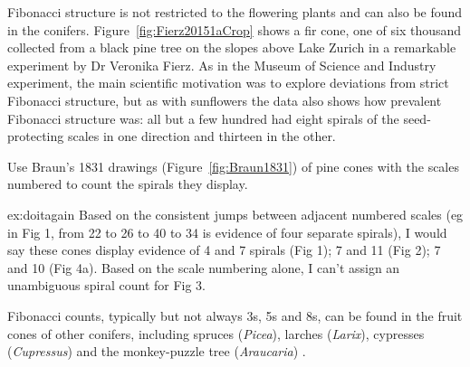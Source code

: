 Fibonacci structure is not restricted to the flowering plants and can also be found in the conifers. 
Figure~\ref{fig:Fierz20151aCrop} shows a fir cone, one of six thousand collected from a black pine tree on the slopes above Lake Zurich in a remarkable experiment by Dr Veronika Fierz. As in the Museum of Science and Industry experiment, the main scientific motivation was to explore deviations from strict Fibonacci structure, but as with sunflowers the data also shows how prevalent Fibonacci structure was: all but a few hundred had eight spirals of the seed-protecting scales in one direction and thirteen in the other. 
%

\begin{jExercise}
	\label{ex:doitagain}
	Use Braun's 1831 drawings (Figure~\ref{fig:Braun1831}) of pine cones with the scales numbered to count the spirals they display.
\end{jExercise}
\begin{jAnswer}{ex:doitagain}
Based on the consistent jumps between adjacent numbered scales (eg in Fig 1, from 22 to 26 to 40 to 34 is evidence of four separate spirals), I would say these cones display evidence of 4 and 7 spirals (Fig 1); 7 and 11 (Fig 2); 7 and 10 (Fig 4a). Based on the scale numbering alone, I can't assign an unambiguous spiral count  for Fig 3. 
\end{jAnswer}

Fibonacci counts, typically but not always 3s, 5s and 8s, can be found in the fruit cones of other conifers, including spruces (\textit{Picea}), larches (\textit{Larix}),  cypresses (\textit{Cupressus}) \cite{fierzAberrantPhyllotacticPatterns2015} and the monkey-puzzle tree (\textit{Araucaria}) \cite{churchRelationPhyllotaxisMechanical1904}. 





